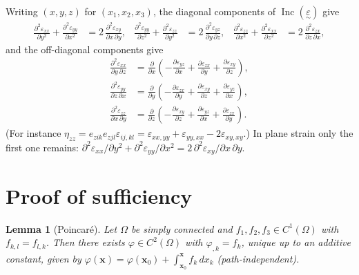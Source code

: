 \documentclass[11pt,a4paper]{article}
\newtheorem{lemma}{Lemma}
\theoremstyle{remark}
\newcommand{\eps}{\varepsilon}
\newcommand{\teps}{\underset{\sim}{\varepsilon}}
\newcommand{\Inc}{\operatorname{Inc}}
\newcommand{\pd}[2]{\frac{\partial #1}{\partial #2}}
\newcommand{\pdd}[3]{\frac{\partial^2 #1}{\partial #2\,\partial #3}}
\begin{document}
Writing $(x,y,z)$ for $(x_1,x_2,x_3)$, the diagonal components of $\Inc(\teps)$ give
\begin{align}
  \pd{^2\eps_{xx}}{y^2}+\pd{^2\eps_{yy}}{x^2} &= 2\,\pdd{\eps_{xy}}{x}{y}, &
  \pd{^2\eps_{yy}}{z^2}+\pd{^2\eps_{zz}}{y^2} &= 2\,\pdd{\eps_{yz}}{y}{z}, &
  \pd{^2\eps_{zz}}{x^2}+\pd{^2\eps_{xx}}{z^2} &= 2\,\pdd{\eps_{zx}}{z}{x},
\end{align}
and the off-diagonal components give
\begin{align}
  \pdd{\eps_{xx}}{y}{z} &= \pd{}{x}\left(-\pd{\eps_{yz}}{x}+\pd{\eps_{zx}}{y}+\pd{\eps_{xy}}{z}\right),\\
  \pdd{\eps_{yy}}{z}{x} &= \pd{}{y}\left(-\pd{\eps_{zx}}{y}+\pd{\eps_{xy}}{z}+\pd{\eps_{yz}}{x}\right),\\
  \pdd{\eps_{zz}}{x}{y} &= \pd{}{z}\left(-\pd{\eps_{xy}}{z}+\pd{\eps_{yz}}{x}+\pd{\eps_{zx}}{y}\right).
\end{align}
(For instance $\eta_{zz}=e_{zik}e_{zjl}\eps_{ij,kl}=\eps_{xx,yy}+\eps_{yy,xx}-2\eps_{xy,xy}$.)
In plane strain only the first one remains: $\partial^2\eps_{xx}/\partial y^2+\partial^2\eps_{yy}/\partial x^2=2\,\partial^2\eps_{xy}/\partial x\,\partial y$.

\section{Proof of sufficiency}

\begin{lemma}[Poincaré]\label{lem:poincare}
Let $\Omega$ be simply connected and $f_1,f_2,f_3\in C^1(\Omega)$ with $f_{k,l}=f_{l,k}$. Then there exists $\varphi\in C^2(\Omega)$ with $\varphi_{,k}=f_k$, unique up to an additive constant, given by
$\varphi(\boldsymbol x)=\varphi(\boldsymbol x_0)+\int_{\boldsymbol x_0}^{\boldsymbol x} f_k\,dx_k$ (path-independent).
\end{lemma}
\end{document}
